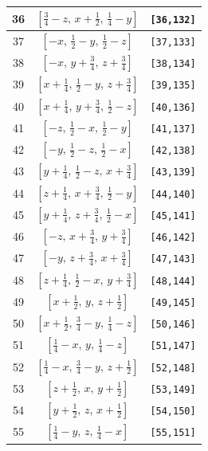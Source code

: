 \documentclass[fleqn,8pt]{jsarticle}
\begin{document}
\begin{longtable}{ccc}
36 & $\left[ \frac{3}{4} - z,\, x + \frac{1}{2},\, \frac{1}{4} - y \right]$ & {\tt [36,132]} \\ \hline
37 & $\left[ - x,\, \frac{1}{2} - y,\, \frac{1}{2} - z \right]$ & {\tt [37,133]} \\ \hline
38 & $\left[ - x,\, y + \frac{3}{4},\, z + \frac{3}{4} \right]$ & {\tt [38,134]} \\ \hline
39 & $\left[ x + \frac{1}{4},\, \frac{1}{2} - y,\, z + \frac{3}{4} \right]$ & {\tt [39,135]} \\ \hline
40 & $\left[ x + \frac{1}{4},\, y + \frac{3}{4},\, \frac{1}{2} - z \right]$ & {\tt [40,136]} \\ \hline
41 & $\left[ - z,\, \frac{1}{2} - x,\, \frac{1}{2} - y \right]$ & {\tt [41,137]} \\ \hline
42 & $\left[ - y,\, \frac{1}{2} - z,\, \frac{1}{2} - x \right]$ & {\tt [42,138]} \\ \hline
43 & $\left[ y + \frac{1}{4},\, \frac{1}{2} - z,\, x + \frac{3}{4} \right]$ & {\tt [43,139]} \\ \hline
44 & $\left[ z + \frac{1}{4},\, x + \frac{3}{4},\, \frac{1}{2} - y \right]$ & {\tt [44,140]} \\ \hline
45 & $\left[ y + \frac{1}{4},\, z + \frac{3}{4},\, \frac{1}{2} - x \right]$ & {\tt [45,141]} \\ \hline
46 & $\left[ - z,\, x + \frac{3}{4},\, y + \frac{3}{4} \right]$ & {\tt [46,142]} \\ \hline
47 & $\left[ - y,\, z + \frac{3}{4},\, x + \frac{3}{4} \right]$ & {\tt [47,143]} \\ \hline
48 & $\left[ z + \frac{1}{4},\, \frac{1}{2} - x,\, y + \frac{3}{4} \right]$ & {\tt [48,144]} \\ \hline
49 & $\left[ x + \frac{1}{2},\, y,\, z + \frac{1}{2} \right]$ & {\tt [49,145]} \\ \hline
50 & $\left[ x + \frac{1}{2},\, \frac{3}{4} - y,\, \frac{1}{4} - z \right]$ & {\tt [50,146]} \\ \hline
51 & $\left[ \frac{1}{4} - x,\, y,\, \frac{1}{4} - z \right]$ & {\tt [51,147]} \\ \hline
52 & $\left[ \frac{1}{4} - x,\, \frac{3}{4} - y,\, z + \frac{1}{2} \right]$ & {\tt [52,148]} \\ \hline
53 & $\left[ z + \frac{1}{2},\, x,\, y + \frac{1}{2} \right]$ & {\tt [53,149]} \\ \hline
54 & $\left[ y + \frac{1}{2},\, z,\, x + \frac{1}{2} \right]$ & {\tt [54,150]} \\ \hline
55 & $\left[ \frac{1}{4} - y,\, z,\, \frac{1}{4} - x \right]$ & {\tt [55,151]} \\ \hline

\end{longtable}
\end{document}
